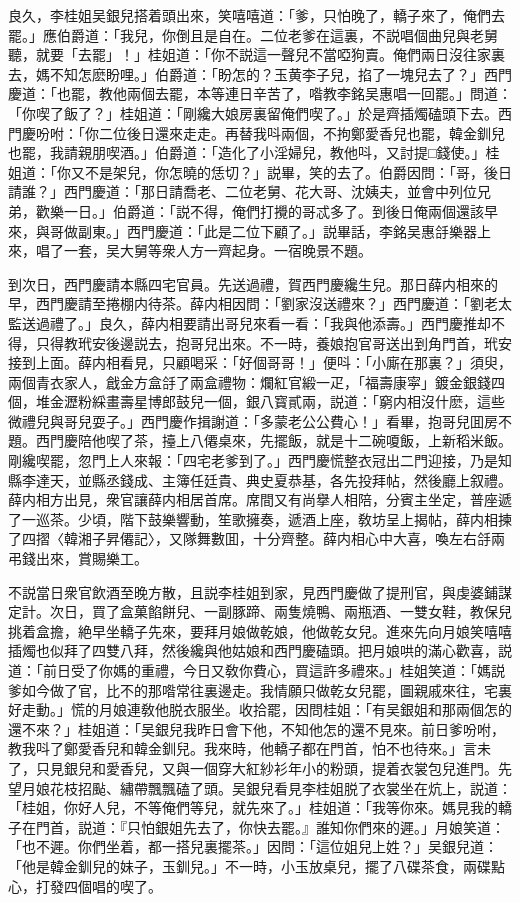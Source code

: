 良久，李桂姐吴銀兒搭着頭出來，笑嘻嘻道：「爹，只怕晚了，轎子來了，俺們去罷。」應伯爵道：「我兒，你倒且是自在。二位老爹在這裏，不説唱個曲兒與老舅聽，就要「去罷」！」桂姐道：「你不説這一聲兒不當啞狗賣。俺們兩日沒往家裏去，媽不知怎麽盼哩。」伯爵道：「盼怎的？玉黄李子兒，掐了一塊兒去了？」西門慶道：「也罷，教他兩個去罷，本等連日辛苦了，喒教李銘吴惠唱一回罷。」問道：「你喫了飯了？」桂姐道：「剛纔大娘房裏留俺們喫了。」於是齊插燭磕頭下去。西門慶吩咐：「你二位後日還來走走。再替我呌兩個，不拘鄭愛香兒也罷，韓金釧兒也罷，我請親朋喫酒。」伯爵道：「造化了小淫婦兒，教他呌，又討提□錢使。」桂姐道：「你又不是架兒，你怎曉的恁切？」説畢，笑的去了。伯爵因問：「哥，後日請誰？」西門慶道：「那日請喬老、二位老舅、花大哥、沈姨夫，並會中列位兄弟，歡樂一日。」伯爵道：「説不得，俺們打攪的哥忒多了。到後日俺兩個還該早來，與哥做副東。」西門慶道：「此是二位下顧了。」説畢話，李銘吴惠㧱樂器上來，唱了一套，吴大舅等衆人方一齊起身。一宿晚景不題。

到次日，西門慶請本縣四宅官員。先送過禮，賀西門慶纔生兒。那日薛内相來的早，西門慶請至捲棚内待茶。薛内相因問：「劉家沒送禮來？」西門慶道：「劉老太監送過禮了。」良久，薛内相要請出哥兒來看一看：「我與他添壽。」西門慶推却不得，只得教玳安後邊説去，抱哥兒出來。不一時，養娘抱官哥送出到角門首，玳安接到上面。薛内相看見，只顧喝采：「好個哥哥！」便呌：「小廝在那裏？」須臾，兩個青衣家人，戧金方盒㧱了兩盒禮物：爛紅官緞一疋，「福壽康寜」鍍金銀錢四個，堆金瀝粉綵畫壽星博郎鼓兒一個，銀八寳貳兩，説道：「窮内相沒什麽，這些微禮兒與哥兒耍子。」西門慶作揖謝道：「多蒙老公公費心！」看畢，抱哥兒囬房不題。西門慶陪他喫了茶，擡上八僊桌來，先擺飯，就是十二碗嗄飯，上新稻米飯。剛纔喫罷，忽門上人來報：「四宅老爹到了。」西門慶慌整衣冠出二門迎接，乃是知縣李達天，並縣丞錢成、主簿任廷貴、典史夏恭基，各先投拜帖，然後廳上叙禮。薛内相方出見，衆官讓薛内相居首席。席間又有尚擧人相陪，分賓主坐定，普座遞了一巡茶。少頃，階下鼓樂響動，笙歌擁奏，遞酒上座，敎坊呈上揭帖，薛内相揀了四摺〈韓湘子昇僊記〉，又隊舞數囬，十分齊整。薛内相心中大喜，喚左右㧱兩弔錢出來，賞賜樂工。

不説當日衆官飲酒至晚方散，且説李桂姐到家，見西門慶做了提刑官，與虔婆鋪謀定計。次日，買了盒菓餡餅兒、一副豚蹄、兩隻燒鴨、兩瓶酒、一雙女鞋，教保兒挑着盒擔，絶早坐轎子先來，要拜月娘做乾娘，他做乾女兒。進來先向月娘笑嘻嘻插燭也似拜了四雙八拜，然後纔與他姑娘和西門慶磕頭。把月娘哄的滿心歡喜，説道：「前日受了你媽的重禮，今日又敎你費心，買這許多禮來。」桂姐笑道：「媽説爹如今做了官，比不的那喒常往裏邊走。我情願只做乾女兒罷，圖親戚來往，宅裏好走動。」慌的月娘連敎他脱衣服坐。收拾罷，因問桂姐：「有吴銀姐和那兩個怎的還不來？」桂姐道：「吴銀兒我昨日會下他，不知他怎的還不見來。前日爹吩咐，教我呌了鄭愛香兒和韓金釧兒。我來時，他轎子都在門首，怕不也待來。」言未了，只見銀兒和愛香兒，又與一個穿大紅紗衫年小的粉頭，提着衣裳包兒進門。先望月娘花枝招颭、繡帶飄飄磕了頭。吴銀兒看見李桂姐脱了衣裳坐在炕上，説道：「桂姐，你好人兒，不等俺們等兒，就先來了。」桂姐道：「我等你來。媽見我的轎子在門首，説道：『只怕銀姐先去了，你快去罷。』誰知你們來的遲。」月娘笑道：「也不遲。你們坐着，都一搭兒裏擺茶。」因問：「這位姐兒上姓？」吴銀兒道：「他是韓金釧兒的妹子，玉釧兒。」不一時，小玉放桌兒，擺了八碟茶食，兩碟點心，打發四個唱的喫了。

